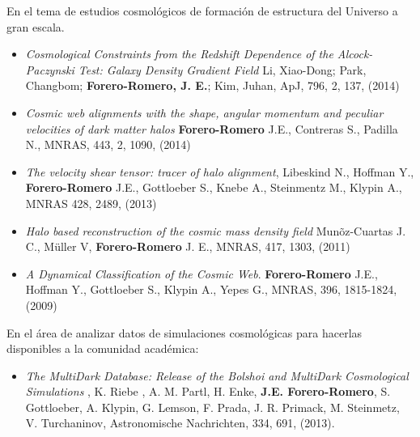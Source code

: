 En el tema de estudios cosmol\'ogicos de formaci\'on de estructura del
Universo a gran escala.

\begin{itemize}

\item {\it Cosmological Constraints from the Redshift Dependence of
  the Alcock-Paczynski Test: Galaxy Density Gradient Field} 	
	Li, Xiao-Dong; Park, Changbom; {\bf Forero-Romero, J. E.}; Kim,
        Juhan, ApJ, 796, 2, 137, (2014)

\item {\it Cosmic web alignments with the shape, angular momentum and
  peculiar velocities of dark matter halos} {\bf Forero-Romero} J.E.,
  Contreras S., Padilla N., MNRAS, 443, 2, 1090, (2014)

\item{\it The velocity shear tensor: tracer of halo alignment},
  Libeskind N., Hoffman Y., {\bf Forero-Romero} J.E., Gottloeber S.,
  Knebe A., Steinmentz M., Klypin A., MNRAS 428, 2489, (2013) 

\item
{\it Halo based reconstruction of the cosmic mass density field}
Mun\~oz-Cuartas J. C., M\"uller V, {\bf Forero-Romero} J. E., MNRAS,
417, 1303, (2011)

\item
{\it A Dynamical Classification of the  Cosmic Web}.  {\bf
  Forero-Romero} J.E., Hoffman Y.,  Gottloeber S., Klypin A., Yepes G., MNRAS, 396, 1815-1824, (2009)

\end{itemize}

\noindent 
En el \'area de analizar datos de simulaciones cosmol\'ogicas
para hacerlas disponibles a la comunidad acad\'emica:

\begin{itemize}
\item{\it The MultiDark Database: Release of the Bolshoi and
  MultiDark Cosmological Simulations} , K. Riebe , A. M. Partl,
  H. Enke, {\bf J.E. Forero-Romero}, S. Gottloeber, A. Klypin,
  G. Lemson, F. Prada, J. R. Primack, M. Steinmetz, V. Turchaninov,
  Astronomische Nachrichten, 334, 691, (2013). 
\end{itemize}


